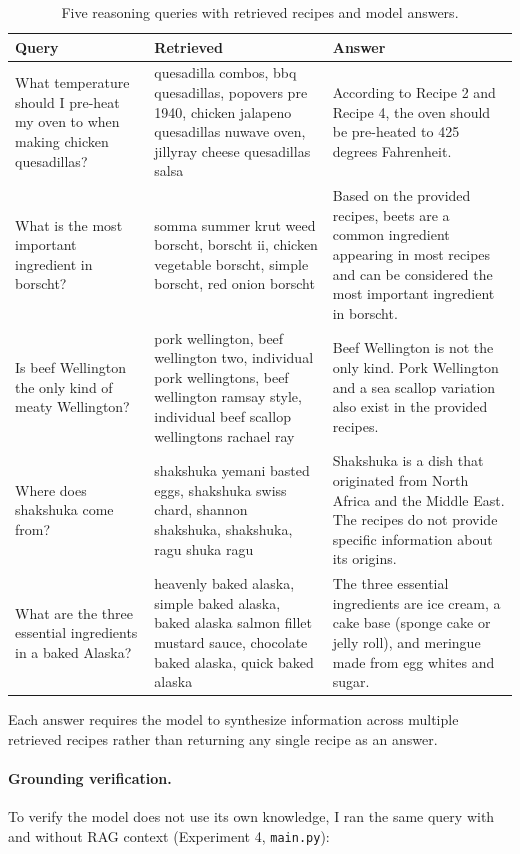 \documentclass[a4paper,11pt]{article}
\begin{document}
\begin{table}[ht]
\centering
\caption{Five reasoning queries with retrieved recipes and model answers.}
\label{tab:reasoning}
\begin{tabular}{p{} p{} p{}}
\hline
\textbf{Query} & \textbf{Retrieved} & \textbf{Answer} \\
\hline
What temperature should I pre-heat my oven to when making chicken quesadillas?
& quesadilla combos, bbq quesadillas, popovers pre 1940, chicken jalapeno quesadillas nuwave oven, jillyray cheese quesadillas salsa
& According to Recipe 2 and Recipe 4, the oven should be pre-heated to 425 degrees Fahrenheit. \\
\addlinespace
What is the most important ingredient in borscht?
& somma summer krut weed borscht, borscht ii, chicken vegetable borscht, simple borscht, red onion borscht
& Based on the provided recipes, beets are a common ingredient appearing in most recipes and can be considered the most important ingredient in borscht. \\
\addlinespace
Is beef Wellington the only kind of meaty Wellington?
& pork wellington, beef wellington two, individual pork wellingtons, beef wellington ramsay style, individual beef scallop wellingtons rachael ray
& Beef Wellington is not the only kind. Pork Wellington and a sea scallop variation also exist in the provided recipes. \\
\addlinespace
Where does shakshuka come from?
& shakshuka yemani basted eggs, shakshuka swiss chard, shannon shakshuka, shakshuka, ragu shuka ragu
& Shakshuka is a dish that originated from North Africa and the Middle East. The recipes do not provide specific information about its origins. \\
\addlinespace
What are the three essential ingredients in a baked Alaska?
& heavenly baked alaska, simple baked alaska, baked alaska salmon fillet mustard sauce, chocolate baked alaska, quick baked alaska
& The three essential ingredients are ice cream, a cake base (sponge cake or jelly roll), and meringue made from egg whites and sugar. \\
\hline
\end{tabular}
\end{table}

Each answer requires the model to synthesize information across multiple retrieved recipes rather than returning any single recipe as an answer.

\paragraph{Grounding verification.}
To verify the model does not use its own knowledge, I ran the same query with and without RAG context (Experiment 4, \texttt{main.py}):
\end{document}

